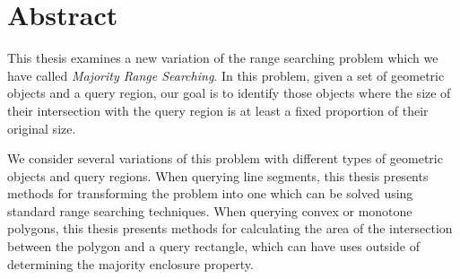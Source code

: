 \chapter*{Abstract}

This thesis examines a new variation of the range searching problem which we have called \emph{Majority Range Searching}. 
In this problem, given a set of geometric objects and a query region, our goal is to identify those objects where the size of their intersection with the query region is at least a fixed proportion of their original size.

We consider several variations of this problem with different types of geometric objects and query regions. 
When querying line segments, this thesis presents methods for transforming the problem into one which can be solved using standard range searching techniques.
When querying convex or monotone polygons, this thesis presents methods for calculating the area of the intersection between the polygon and a query rectangle, which can have uses outside of determining the majority enclosure property.

